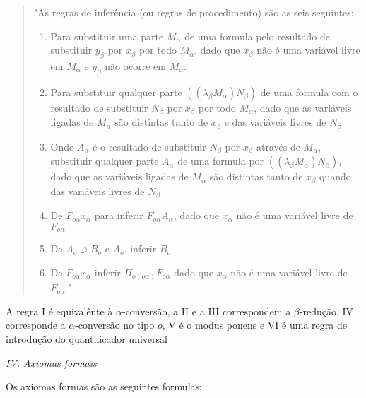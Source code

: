\documentclass[../main.tex]{subfiles}
\begin{document}
\begin{quote}
    "As regras de inferência (ou regras de procedimento) são as seis seguintes:
    \begin{enumerate}[label=\Roman*]
        \item Para substituir uma parte $M_{\alpha}$ de uma formula pelo resultado de substituir $y_{\beta}$ por $x_{\beta}$ por todo $M_{\alpha}$, dado que $x_{\beta}$ não é uma variável livre em $M_{\alpha}$ e $y_{\beta}$ não ocorre em $M_{\alpha}$.
        \item Para substituir qualquer parte $((\lambda_{\beta}M_{\alpha})N_{\beta})$ de uma formula com o resultado de substituir $N_{\beta}$ por $x_{\beta}$ por todo $M_{\alpha}$, dado que as variáveis ligadas de $M_{\alpha}$ são distintas tanto de $x_{\beta}$ e das variáveis livres de $N_{\beta}$
        \item Onde $A_{\alpha}$ é o resultado de substituir $N_{\beta}$ por $x_{\beta}$ através de $M_{\alpha}$, substituir qualquer parte $A_{\alpha}$ de uma formula por $((\lambda_{\beta}M_{\alpha})N_{\beta})$, dado que as variáveis ligadas de $M_{\alpha}$ são distintas tanto de $x_{\beta}$ quando das variáveis livres de $N_{\beta}$
        \item De $F_{o \alpha} x_{\alpha}$ para inferir $F_{o \alpha} A_{\alpha}$, dado que $x_{\alpha}$ não é uma variável livre de $F_{o \alpha}$
        \item De $A_o \supset B_o$ e $A_o$, inferir $B_o$
        \item De $F_{o \alpha} x_{\alpha}$ inferir $\Pi_{o(o\alpha)}F_{o \alpha}$ dado que $x_{\alpha}$ não é uma variável livre de $F_{o \alpha}$
        "
        \cite[pag. 60]{church1940}
    \end{enumerate}
\end{quote}

A regra I é equivalênte à $\alpha$-conversão, a II e a III correspondem a $\beta$-redução, IV corresponde a $\alpha$-conversão no tipo $o$, V é o modus ponens e VI é uma regra de introdução do quantificador universal

\emph{IV. Axiomas formais}

Os axiomas formas são as seguintes formulas:
\end{document}
